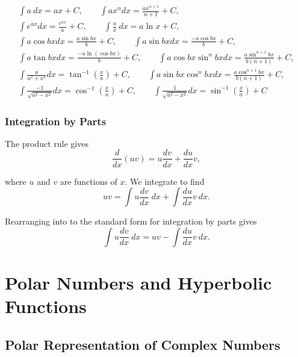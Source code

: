 \documentclass{article}
\begin{document}
\begin{gather*}
    \int a\ dx = ax + C, \qquad \int ax^n dx = \frac{ax^{n + 1}}{n + 1} + C, \\
    \int e^{ax} dx = \frac{e^{ax}}{a} + C, \qquad \int \frac{a}{x}\ dx = a\ln{x} + C, \\
    \int a \cos{bx} dx = \frac{a\sin{bx}}{b} + C, \qquad \int a \sin{bx} dx = \frac{-a\cos{bx}}{b} + C, \\
    \int a\tan{bx}dx = \frac{-a\ln{\left( \cos{bx} \right)}}{b} + C, \qquad \int a\cos{bx}\sin^n{bx}dx = \frac{a\sin^{n + 1}{bx}}{b\left( n + 1 \right)} + C, \\
    \int \frac{a}{a^2 + x^2}dx = \tan^{-1}{\left( \frac{x}{a} \right)} + C, \qquad \int a\sin{bx}\cos^n{bx}dx = \frac{a\cos^{n + 1}{bx}}{b\left( n + 1 \right)} + C, \\
    \int \frac{-1}{\sqrt{a^2 - x^2}}dx = \cos^{-1}{\left( \frac{x}{a} \right)} + C, \qquad \int \frac{1}{\sqrt{a^2 - x^2}}dx = \sin^{-1}{\left( \frac{x}{a} \right)} + C
\end{gather*}

\subsubsection{Integration by Parts}

The product rule gives
\begin{equation*}
    \frac{d}{dx}(uv) = u\frac{dv}{dx} + \frac{du}{dx}v,
\end{equation*}

where $u$ and $v$ are functions of $x$. We integrate to find
\begin{equation*}
    uv = \int u \frac{dv}{dx}\ dx + \int \frac{du}{dx}v\ dx.
\end{equation*}

Rearranging into to the standard form for integration by parts gives
\begin{equation*}
    \int u \frac{dv}{dx}\ dx = uv - \int \frac{du}{dx}v\ dx.
\end{equation*}

\section{Polar Numbers and Hyperbolic Functions}

\subsection{Polar Representation of Complex Numbers}
\end{document}
